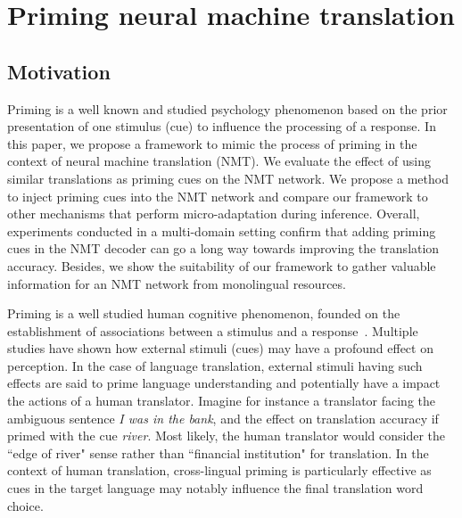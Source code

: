 \chapter{Priming neural machine translation}
\label{chap:priming}
\section{Motivation}
Priming is a well known and studied psychology phenomenon based on the prior presentation of one stimulus (cue) to influence the processing of a response. 
In this paper, we propose a framework to mimic the process of priming in the context of neural machine translation (NMT). 
We evaluate the effect of using similar translations as priming cues on the NMT network. 
We propose a method to inject priming cues into the NMT network
and compare our framework to other mechanisms that perform micro-adaptation during inference. 
Overall, experiments conducted in a multi-domain setting confirm that adding priming cues in the NMT decoder can go a long way towards improving the translation accuracy.
Besides, we show the suitability of our framework to gather valuable information for an NMT network from monolingual resources. 

Priming is a well studied human cognitive phenomenon, founded on the establishment of associations between a stimulus and a response~\cite{Tulving82Priming}. Multiple studies have shown how external stimuli (cues) may have a profound effect on perception.
%
In the case of language translation, external stimuli having such effects are said to prime language understanding and potentially have a impact the actions of a human translator. 
Imagine for instance a translator facing the ambiguous sentence {\it I was in the bank}, and the effect on translation accuracy if primed with the cue {\it river}. Most likely, the human translator would consider the ``edge of river" sense rather than ``financial institution" for translation. 
In the context of human translation, cross-lingual priming is particularly effective as cues in the target language may 
notably influence the final translation word choice.

